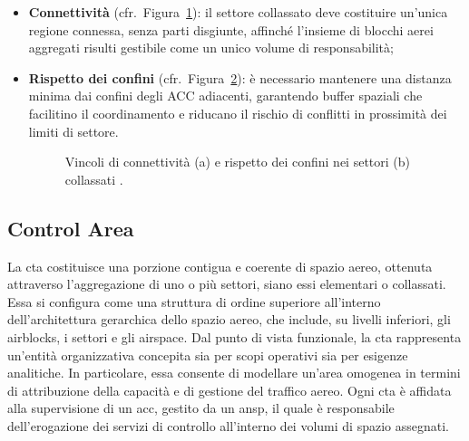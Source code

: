 \begin{itemize}
  \item {\bf Connettività} (cfr.~Figura~\ref{fig:connectivity}): il settore collassato deve costituire un’unica regione connessa, senza parti disgiunte, affinché l’insieme di blocchi aerei aggregati risulti gestibile come un unico volume di responsabilità;
  \item {\bf Rispetto dei confini} (cfr.~Figura~\ref{fig:boundary}): è necessario mantenere una distanza minima dai confini degli ACC adiacenti, garantendo buffer spaziali che facilitino il coordinamento e riducano il rischio di conflitti in prossimità dei limiti di settore.
  \begin{figure}[htbp]
    \centering
    \begin{subfigure}[b]{0.45\textwidth}
      \centering
      
      \label{fig:connectivity}
    \end{subfigure}\hfill
    \begin{subfigure}[b]{0.45\textwidth}
      \centering
      
      \label{fig:boundary}
    \end{subfigure}
    \caption{Vincoli di connettività (a) e rispetto dei confini nei settori (b) collassati \cite{treimuth2018dynamic}.}
    \label{fig:constraints_cd}
  \end{figure}
\end{itemize}
\EnablePunct
\subsection{Control Area}
La \gls{cta} costituisce una porzione contigua e coerente di spazio aereo, ottenuta attraverso l’aggregazione di uno o più settori, siano essi elementari o collassati. Essa si configura come una struttura di ordine superiore all’interno dell’architettura gerarchica dello spazio aereo, che include, su livelli inferiori, gli airblocks, i settori e gli airspace.
Dal punto di vista funzionale, la \acrshort{cta} rappresenta un'entità organizzativa concepita sia per scopi operativi sia per esigenze analitiche. In particolare, essa consente di modellare un’area omogenea in termini di attribuzione della capacità e di gestione del traffico aereo. Ogni \acrshort{cta} è affidata alla supervisione di un \Gls{acc}, gestito da un \Gls{ansp}, il quale è responsabile dell’erogazione dei servizi di controllo all’interno dei volumi di spazio assegnati.


